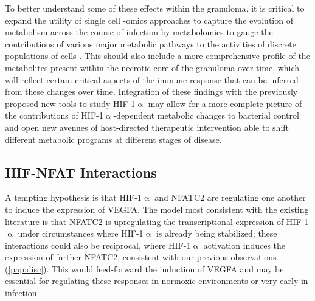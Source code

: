 To better understand some of these effects within the granuloma, it is critical to expand the utility of single cell -omics approaches to capture the evolution of metabolism across the course of infection by metabolomics to gauge the contributions of various major metabolic pathways to the activities of discrete populations of cells \citep{Somashekar2011}. This should also include a more comprehensive profile of the metabolites present within the necrotic core of the granuloma over time, which will reflect certain critical aspects of the immune response that can be inferred from these changes over time. Integration of these findings with the previously proposed new tools to study HIF-1$\upalpha$ may allow for a more complete picture of the contributions of HIF-1$\upalpha$-dependent metabolic changes to bacterial control and open new avenues of host-directed therapeutic intervention able to shift different metabolic programs at different stages of disease.
 
\subsection{HIF\hyp{}NFAT Interactions}\label{hifnfat}

A tempting hypothesis is that HIF\hyp{}1$\upalpha$ and NFATC2 are regulating one another to induce the expression of VEGFA. The model most consistent with the existing literature is that NFATC2 is upregulating the transcriptional expression of HIF\hyp{}1$\upalpha$ under circumstances where HIF\hyp{}1$\upalpha$ is already being stabilized; these interactions could also be reciprocal, where HIF\hyp{}1$\upalpha$ activation induces the expression of further NFATC2, consistent with our previous observations (\autoref{pap:disc}). This would feed\hyp{}forward the induction of VEGFA and may be essential for regulating these responses in normoxic environments or very early in infection. 

